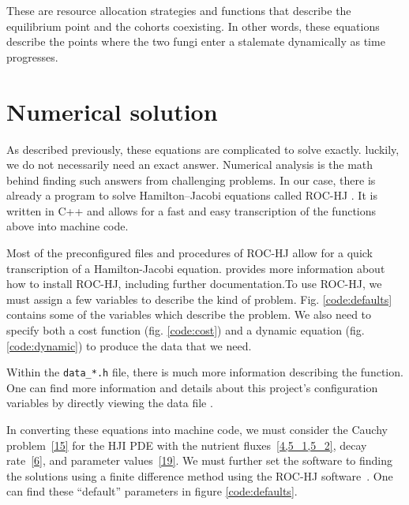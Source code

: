 \documentclass[11pt]{amsart}
\begin{document}
These are resource allocation strategies and functions that describe the equilibrium point and the cohorts coexisting. In other words, these equations describe the points where the two fungi enter a stalemate dynamically as time progresses. 



\section{Numerical solution}
As described previously, these equations are complicated to solve exactly. luckily, we do not necessarily need an exact answer. Numerical analysis is the math behind finding such answers from challenging problems. In our case, there is already a program to solve Hamilton--Jacobi equations called ROC-HJ \cite{ROCHJ2019}. It is written in C++ and allows for a fast and easy
transcription of the functions above into machine code. 

Most of the preconfigured files and procedures of ROC-HJ allow for a quick transcription
of a Hamilton-Jacobi equation. \cite{ROCHJ2019} provides more information about how to install ROC-HJ, including further documentation.To use ROC-HJ, we must assign a few variables to describe the kind
of problem. Fig. \ref{code:defaults} contains some of the variables which
describe the problem. We also need to specify both a cost function (fig. \ref{code:cost}) and a dynamic equation (fig. \ref{code:dynamic}) to produce the data that we need.


Within the \texttt{data\_*.h} file, there is much more information describing
the function. One can find more information and details about this project's
configuration variables by directly viewing the data file \cite{data_ivan.h}.

In converting these equations into machine code, we must consider the Cauchy problem~\cref{15} for the HJI PDE with the nutrient
fluxes~\cref{4,5_1,5_2}, decay rate~\cref{6}, and parameter values~\cref{19}. We must further set the software to finding the solutions using a finite difference method 
\cite{FlemingSoner2006,
      OsherShu1991,
      BotkinHoffmannTurova2011,
      BokanForcadelZidani2010}
using the ROC-HJ software~\cite{ROCHJ2019}. One can find these ``default'' parameters in figure \ref{code:defaults}.
\end{document}
